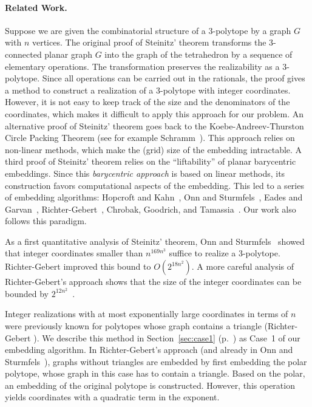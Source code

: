 \documentclass{article}
\theoremstyle{plain} \newtheorem{thm}{Theorem}[section]
\begin{document}
\paragraph{Related Work.}
Suppose we are given the combinatorial structure of a 3-polytope by
a graph $G$
with $n$ vertices.
The original proof of Steinitz' theorem transforms the
3-connected planar graph $G$ into the graph of the tetrahedron by a
sequence of elementary operations.
The transformation preserves the realizability as a 3-polytope. Since all operations can be carried out in the rationals, the proof gives a method to construct a realization of a 3-polytope with integer coordinates. However, it is not easy to keep track of the size and the denominators of the coordinates, which makes it difficult to apply this approach for our problem. An alternative proof of Steinitz' theorem goes back to the Koebe-Andreev-Thurston Circle Packing Theorem (see for example Schramm~\cite{s-eupsc-91}). This
approach relies on non-linear methods, which make the (grid) size of the embedding intractable. 
A third proof of Steinitz' theorem relies on the ``liftability''  of planar barycentric embeddings. Since this \emph{barycentric approach} is based on linear methods, its construction favors computational aspects of the embedding.  
This led to a series of embedding algorithms: Hopcroft and Kahn~\cite{hk-prga-92}, Onn and Sturmfels~\cite{os-qst-94}, Eades and Garvan~\cite{eg-dspgt-95}, Richter-Gebert~\cite{rg-rsp-96}, 
Chrobak, Goodrich, and Tamassia~\cite{cgt-cdgtt-96}.
Our work also follows this paradigm.

As a first quantitative analysis of Steinitz' theorem, Onn and Sturmfels~\cite{os-qst-94} showed that integer coordinates smaller than $n^{169n^3}$ suffice to realize a 3-polytope. 
Richter-Gebert improved this bound to $O(2^{18n^2})$. A more careful analysis of Richter-Gebert's approach shows that the size of the integer coordinates can be bounded by $2^{12n^2}$~\cite{r-rcpps-06}.


Integer realizations with at most exponentially large 
coordinates in terms of $n$ 
were previously known for polytopes whose graph contains a
triangle (Richter-Gebert  \cite{rg-rsp-96}). We describe this method in Section~\ref{sec:case1} (p.~\pageref{sec:case1}) as  Case~1
of our embedding algorithm.
In Richter-Gebert's approach (and already in
Onn and Sturmfels~\cite{os-qst-94}),
 graphs without triangles are embedded by first embedding the polar polytope, whose graph in this case has to contain a triangle. Based on the polar, an embedding of the original polytope is constructed. However, this
operation yields coordinates with a quadratic term in the exponent.
\end{document}
